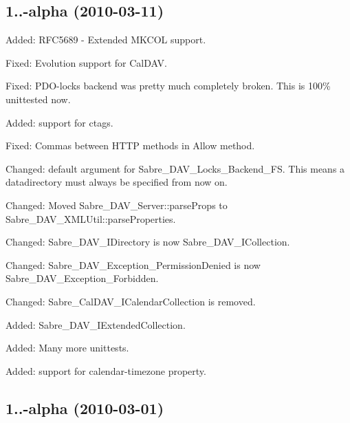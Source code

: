 \subsection*{1..-\/alpha (2010-\/03-\/11) }


\begin{DoxyItemize}
\item Added\+: R\+F\+C5689 -\/ Extended M\+K\+C\+OL support.
\item Fixed\+: Evolution support for Cal\+D\+AV.
\item Fixed\+: P\+D\+O-\/locks backend was pretty much completely broken. This is 100\% unittested now.
\item Added\+: support for ctags.
\item Fixed\+: Comma\textquotesingle{}s between H\+T\+TP methods in \textquotesingle{}Allow\textquotesingle{} method.
\item Changed\+: default argument for Sabre\+\_\+\+D\+A\+V\+\_\+\+Locks\+\_\+\+Backend\+\_\+\+FS. This means a datadirectory must always be specified from now on.
\item Changed\+: Moved Sabre\+\_\+\+D\+A\+V\+\_\+\+Server\+::parse\+Props to Sabre\+\_\+\+D\+A\+V\+\_\+\+X\+M\+L\+Util\+::parse\+Properties.
\item Changed\+: Sabre\+\_\+\+D\+A\+V\+\_\+\+I\+Directory is now Sabre\+\_\+\+D\+A\+V\+\_\+\+I\+Collection.
\item Changed\+: Sabre\+\_\+\+D\+A\+V\+\_\+\+Exception\+\_\+\+Permission\+Denied is now Sabre\+\_\+\+D\+A\+V\+\_\+\+Exception\+\_\+\+Forbidden.
\item Changed\+: Sabre\+\_\+\+Cal\+D\+A\+V\+\_\+\+I\+Calendar\+Collection is removed.
\item Added\+: Sabre\+\_\+\+D\+A\+V\+\_\+\+I\+Extended\+Collection.
\item Added\+: Many more unittests.
\item Added\+: support for calendar-\/timezone property.
\end{DoxyItemize}

\subsection*{1..-\/alpha (2010-\/03-\/01) }


